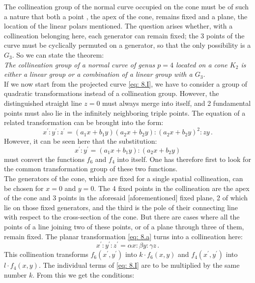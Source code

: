 \documentclass[leqno]{article}
\begin{document}
The collineation group of the normal curve occupied on the cone must be of such a nature that both a point , the apex of the cone, remains fixed and a plane, the location of the linear polars mentioned. The question arises whether, with a collineation belonging here, each generator can remain fixed; the 3 points of the curve must be cyclically permuted on a generator, so that the only possibility is a $G_3$. So we can state the theorem: \\
\textit{The collineation group of a normal curve of genus $p=4$ located on a cone $K_2$ is either a linear group or a combination of a linear group with a $G_3$.} \\
If we now start from the projected curve \eqref{eq: 8.I}, we have to consider a group of quadratic transformations instead of a collineation group. However, the distinguished straight line $z=0$ must always merge into itself, and 2 fundamental points must also lie in the infinitely neighboring triple points. The equation of a related transformation can be brought into the form:
\begin{equation}\label{eq: 8.a}
x^\prime : y^\prime : z^\prime = (a_1 x + b_1 y) (a_2 x + b_2 y) : (a_2 x + b_2 y)^2 : zy \, . \tag{a}
\end{equation}
However, it can be seen here that the substitution: 
\[
x^\prime : y^\prime = (a_1 x + b_1 y) : (a_2 x + b_2 y)
\] 
must convert the functions $f_6$ and $f_4$ into itself. One has therefore first to look for the common transformation group of these two functions. \\
The generators of the cone, which are fixed for a single spatial collineation, can be chosen for $x=0$ and $y=0$. The 4 fixed points in the collineation are the apex of the cone and 3 points in the aforesaid [aforementioned] fixed plane, 2 of which lie on those fixed generators, and the third is the pole of their connecting line with respect to the cross-section of the cone. But there are cases where all the points of a line joining two of these points, or of a plane through three of them, remain fixed. The planar transformation \eqref{eq: 8.a} turns into a collineation here:
\begin{equation}\label{eq: 8.aprime}
x^\prime : y^\prime : z^\prime = \alpha x : \beta y : \gamma z \, . \tag{$a^\prime$}
\end{equation}
This collineation transforms $f_6(x^\prime, y^\prime)$ into $k \cdot f_6(x, y)$ and $f_4(x^\prime, y^\prime)$ into $l \cdot f_4(x,y)$. The individual terms of \eqref{eq: 8.I} are to be multiplied by the same number $k$. From this we get the conditions:
\end{document}
